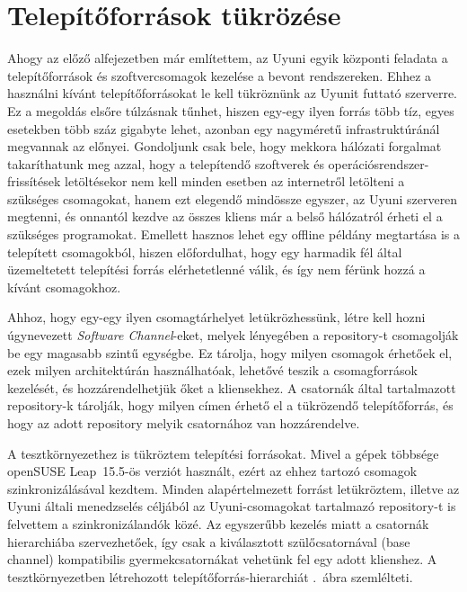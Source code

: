 \section{Telepítőforrások tükrözése}
\label{sect:reposync}
Ahogy az előző alfejezetben már említettem, az Uyuni egyik központi feladata a telepítőforrások és szoftvercsomagok kezelése a bevont rendszereken. Ehhez a használni kívánt telepítőforrásokat le kell tükröznünk az Uyunit futtató szerverre. Ez a megoldás elsőre túlzásnak tűnhet, hiszen egy-egy ilyen forrás több tíz, egyes esetekben több száz gigabyte lehet, azonban egy nagyméretű infrastruktúránál megvannak az előnyei. Gondoljunk csak bele, hogy mekkora hálózati forgalmat takaríthatunk meg azzal, hogy a telepítendő szoftverek és operációsrendszer-frissítések letöltésekor nem kell minden esetben az internetről letölteni a szükséges csomagokat, hanem ezt elegendő mindössze egyszer, az Uyuni szerveren megtenni, és onnantól kezdve az összes kliens már a belső hálózatról érheti el a szükséges programokat.
Emellett hasznos lehet egy offline példány megtartása is a telepített csomagokból, hiszen előfordulhat, hogy egy harmadik fél által üzemeltetett telepítési forrás elérhetetlenné válik, és így nem férünk hozzá a kívánt csomagokhoz.

Ahhoz, hogy egy-egy ilyen csomagtárhelyet letükrözhessünk, létre kell hozni úgynevezett \textit{Software Channel}-eket, melyek lényegében a repository-t csomagolják be egy magasabb szintű egységbe. Ez tárolja, hogy milyen csomagok érhetőek el, ezek milyen architektúrán használhatóak, lehetővé teszik a csomagforrások kezelését, és hozzárendelhetjük őket a kliensekhez. A csatornák által tartalmazott repository-k tárolják, hogy milyen címen érhető el a tükrözendő telepítőforrás, és hogy az adott repository melyik csatornához van hozzárendelve.

A tesztkörnyezethez is tükröztem telepítési forrásokat. Mivel a gépek többsége openSUSE Leap~15.5-ös verziót használt, ezért az ehhez tartozó csomagok szinkronizálásával kezdtem. Minden alapértelmezett forrást letükröztem, illetve az Uyuni általi menedzselés céljából az Uyuni-csomagokat tartalmazó repository-t is felvettem a szinkronizálandók közé. Az egyszerűbb kezelés miatt a csatornák hierarchiába szervezhetőek, így csak a kiválasztott szülőcsatornával (base channel) kompatibilis gyermekcsatornákat vehetünk fel egy adott klienshez. A tesztkörnyezetben létrehozott telepítőforrás-hierarchiát .~ábra szemlélteti.

